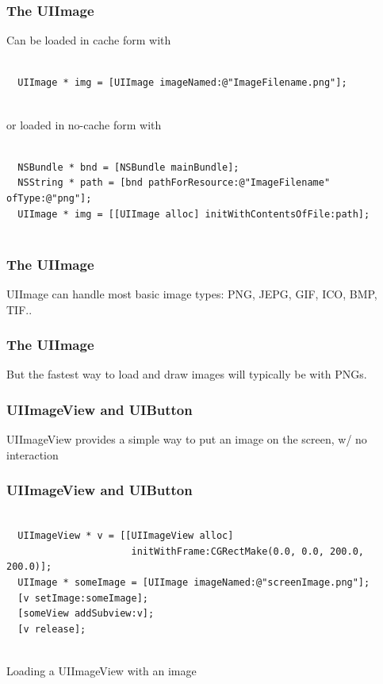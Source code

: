 \documentclass[10pt]{beamer}
\begin{document}
\begin{frame}[fragile]
  \frametitle{The UIImage}
  Can be loaded in cache form with \begin{verbatim}
  
  UIImage * img = [UIImage imageNamed:@"ImageFilename.png"];
              
  \end{verbatim}
or loaded in no-cache form with \begin{verbatim}
  
  NSBundle * bnd = [NSBundle mainBundle];
  NSString * path = [bnd pathForResource:@"ImageFilename" ofType:@"png"];
  UIImage * img = [[UIImage alloc] initWithContentsOfFile:path];
              
  \end{verbatim}

\end{frame}

\begin{frame}[fragile]
  \frametitle{The UIImage}
  UIImage can handle most basic image types: PNG, JEPG, GIF, ICO, BMP, TIF..

\end{frame}

\begin{frame}[fragile]
  \frametitle{The UIImage}
  But the fastest way to load and draw images will typically be with PNGs.

\end{frame}

    
\begin{frame}[fragile]
  \frametitle{UIImageView and UIButton}
  UIImageView provides a simple way to put an image on the screen, w/ no interaction

\end{frame}

\begin{frame}[fragile]
  \frametitle{UIImageView and UIButton}
  \begin{listing}[H]
    \begin{verbatim}
  
  UIImageView * v = [[UIImageView alloc]
                      initWithFrame:CGRectMake(0.0, 0.0, 200.0, 200.0)];
  UIImage * someImage = [UIImage imageNamed:@"screenImage.png"];
  [v setImage:someImage];
  [someView addSubview:v];
  [v release];
              
  \end{verbatim}
    \caption{Loading a UIImageView with an image}
    \label{listing:27}
  \end{listing}

\end{frame}
\end{document}
